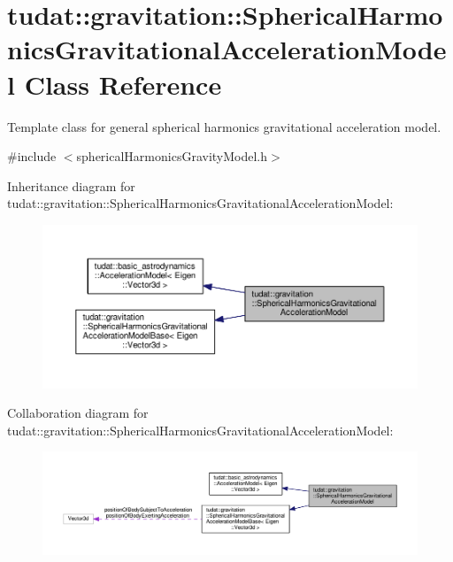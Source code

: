 \hypertarget{classtudat_1_1gravitation_1_1SphericalHarmonicsGravitationalAccelerationModel}{}\section{tudat\+:\+:gravitation\+:\+:Spherical\+Harmonics\+Gravitational\+Acceleration\+Model Class Reference}
\label{classtudat_1_1gravitation_1_1SphericalHarmonicsGravitationalAccelerationModel}


Template class for general spherical harmonics gravitational acceleration model.  




{\ttfamily \#include $<$spherical\+Harmonics\+Gravity\+Model.\+h$>$}



Inheritance diagram for tudat\+:\+:gravitation\+:\+:Spherical\+Harmonics\+Gravitational\+Acceleration\+Model\+:
\nopagebreak
\begin{figure}[H]
\begin{center}
\leavevmode
\includegraphics[width=350pt]{classtudat_1_1gravitation_1_1SphericalHarmonicsGravitationalAccelerationModel__inherit__graph}
\end{center}
\end{figure}


Collaboration diagram for tudat\+:\+:gravitation\+:\+:Spherical\+Harmonics\+Gravitational\+Acceleration\+Model\+:
\nopagebreak
\begin{figure}[H]
\begin{center}
\leavevmode
\includegraphics[width=350pt]{classtudat_1_1gravitation_1_1SphericalHarmonicsGravitationalAccelerationModel__coll__graph}
\end{center}
\end{figure}
